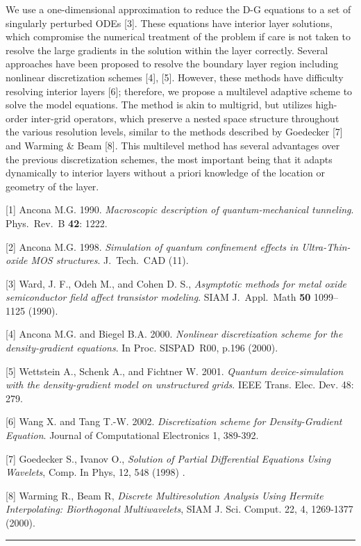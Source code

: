 \documentclass[twosided]{report}
\begin{document}
We use a one-dimensional
approximation to reduce the D-G equations to a set of singularly
perturbed ODEs [3]. These equations have interior layer solutions,
which compromise the numerical treatment of the problem if care is not
taken to resolve the large gradients in the solution within the layer
correctly. Several approaches have been proposed to resolve the
boundary layer region including nonlinear discretization schemes [4],
[5]. However, these methods have difficulty resolving interior layers
[6]; therefore, we propose a multilevel adaptive scheme to solve the
model equations. The method is akin to multigrid, but utilizes
high-order inter-grid operators, which preserve a nested space
structure throughout the various resolution levels, similar to the
methods described by Goedecker [7] and Warming \& Beam [8]. This
multilevel method has several advantages over the previous
discretization schemes, the most important being that it adapts
dynamically to interior layers without a priori knowledge of the
location or geometry of the layer.

[1] Ancona M.G. 1990.
{\em Macroscopic description of quantum-mechanical tunneling}.
Phys.~Rev.~B {\bf 42}: 1222.

[2] Ancona M.G. 1998.
{\em Simulation of quantum confinement effects in
Ultra-Thin-oxide MOS structures}. J.~Tech.~CAD (11).

[3] Ward, J. F., Odeh M., and Cohen D. S.,
{\em Asymptotic methods for metal
oxide semiconductor field affect transistor modeling}.
SIAM J.~Appl.~Math {\bf 50} 1099--1125 (1990).

[4] Ancona M.G. and Biegel B.A. 2000.
{\em Nonlinear discretization scheme
for the density-gradient equations}. In Proc. SISPAD~R00, p.196
(2000).

[5] Wettstein A., Schenk A., and Fichtner W. 2001.
{\em Quantum device-simulation with the density-gradient model
on unstructured grids}. IEEE Trans. Elec. Dev. 48: 279.

[6] Wang X. and Tang T.-W. 2002.
{\em Discretization scheme for Density-Gradient Equation}.
Journal of Computational Electronics 1,
389-392.

[7] Goedecker S., Ivanov O., {\em Solution of Partial Differential
Equations Using Wavelets}, Comp. In Phys, 12, 548 (1998) .

[8] Warming R., Beam R, {\em Discrete Multiresolution Analysis Using
Hermite Interpolating: Biorthogonal Multiwavelets}, SIAM J. Sci.
Comput. 22, 4, 1269-1377 (2000).

\begin{center}

\rule{6in}{1pt}
\end{center}
\end{document}
